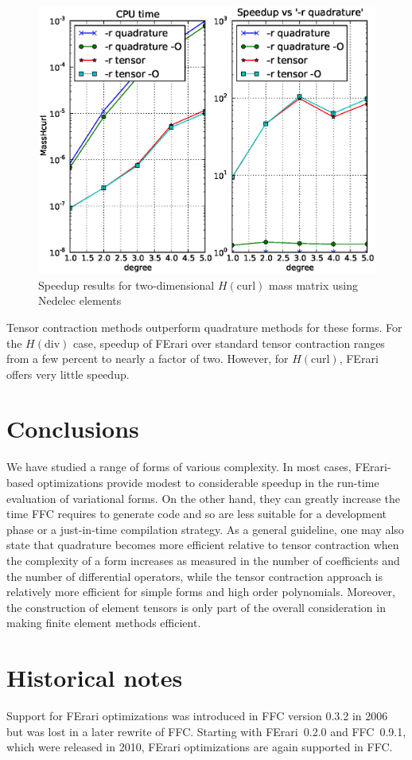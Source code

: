 \begin{figure}
  \begin{center}
    \includegraphics[width=12cm]{chapters/kirby-3/eps/MassHcurl.eps}
    \caption{Speedup results for two-dimensional \( H(\mathrm{curl}) \)
      mass matrix using Nedelec elements}
    \label{fig:MassHcurl}
  \end{center}
\end{figure}

Tensor contraction methods outperform quadrature methods for these
forms. For the \( H(\mathrm{div}) \) case, speedup of FErari over
standard tensor contraction ranges from a few percent to nearly a
factor of two. However, for \( H(\mathrm{curl}) \), FErari offers very
little speedup.

\section{Conclusions}

We have studied a range of forms of various complexity. In most cases,
FErari-based optimizations provide modest to considerable speedup in
the run-time evaluation of variational forms. On the other hand, they
can greatly increase the time FFC requires to generate code and so are
less suitable for a development phase or a just-in-time compilation
strategy. As a general guideline, one may also state that quadrature
becomes more efficient relative to tensor contraction when the
complexity of a form increases as measured in the number of
coefficients and the number of differential operators, while the
tensor contraction approach is relatively more efficient for simple
forms and high order polynomials. Moreover, the construction of
element tensors is only part of the overall consideration in making
finite element methods efficient.

\section{Historical notes}

Support for FErari optimizations was introduced in FFC version 0.3.2
in 2006 but was lost in a later rewrite of FFC. Starting with
FErari~0.2.0 and FFC~0.9.1, which were released in 2010, FErari
optimizations are again supported in FFC.
